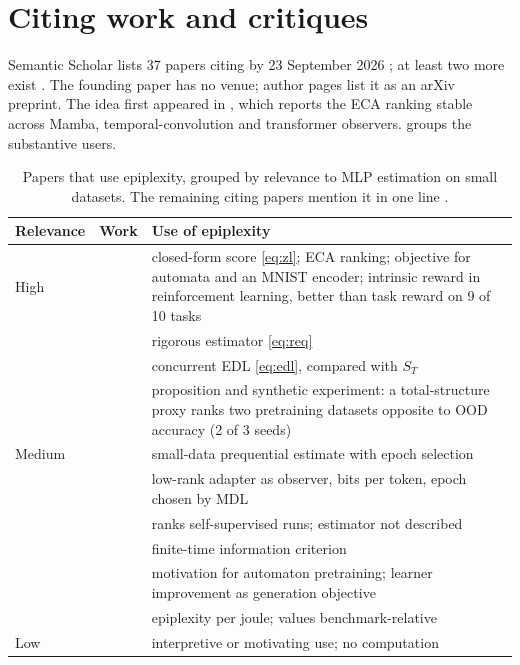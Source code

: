 \documentclass[11pt]{article}
\theoremstyle{tight}
\begin{document}
\section{Citing work and critiques}\label{sec:cite}
Semantic Scholar lists 37 papers citing \citet{finzi2026epiplexity} by 23 September 2026
\citep{s2citations}; at least two more exist \citep{ohzeki2026nonequilibrium,okanohara2026thermo}. The
founding paper has no venue; author pages list it as an arXiv preprint. The idea first appeared in
\citet{jiang2025thesis}, which reports the ECA ranking stable across Mamba, temporal-convolution and
transformer observers.  groups the substantive users.

\begin{table}[!htb]
\centering\footnotesize
\caption{Papers that use epiplexity, grouped by relevance to MLP estimation on small datasets. The
remaining citing papers mention it in one line \citep{s2citations}.}\label{tab:cite}
\begin{tabularx}{\textwidth}{@{}P{1.5cm}P{4.7cm}L@{}}
\toprule
Relevance & Work & Use of epiplexity \\
\midrule
High & \citet{zhang2026learnablenovelty} & closed-form score \eqref{eq:zl}; ECA ranking; objective for automata and an MNIST encoder; intrinsic reward in reinforcement learning, better than task reward on 9 of 10 tasks \\
 & \citet{qiu2026requential} & rigorous estimator \eqref{eq:req} \\
 & \citet{donoway2026edl,donoway2026edlisit} & concurrent EDL \eqref{eq:edl}, compared with $S_T$ \\
 & \citet{li2026counterexample} & proposition and synthetic experiment: a total-structure proxy ranks two pretraining datasets opposite to OOD accuracy (2 of 3 seeds) \\
\midrule
Medium & \citet{liu2026selfplay} & small-data prequential estimate with epoch selection \\
 & \citet{dineen2026vocab} & low-rank adapter as observer, bits per token, epoch chosen by MDL \\
 & \citet{majchrowska2026echo} & ranks self-supervised runs; estimator not described \\
 & \citet{ohzeki2026nonequilibrium} & finite-time information criterion \\
 & \citet{lee2026nca,ren2026creativity} & motivation for automaton pretraining; learner improvement as generation objective \\
 & \citet{takahashi2026thermo} & epiplexity per joule; values benchmark-relative \\
\midrule
Low & \citet{okanohara2026thermo,noguer2026financial,moriondo2026spectral,hu2026speculating,kim2026megadocs,panaganti2026grpo,cornelisse2026autonomy,herrmann2026interestingness} & interpretive or motivating use; no computation \\
\bottomrule
\end{tabularx}
\end{table}
\end{document}
